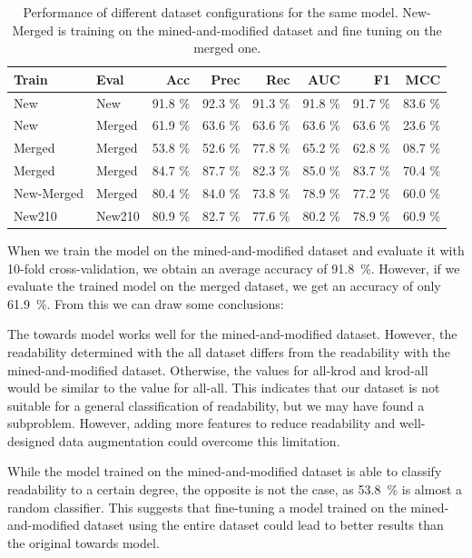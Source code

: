 \documentclass[%
class=scrreprt,
chapterprefix=false,%
open=right,%
twoside=false,%
paper=a4,%
logofile={Logo\_zentral\_farbig\_EN.png},%
thesistype=master,%
UKenglish,%
]{se2thesis}
\theoremstyle{definition}
\begin{document}
	\begin{table}[tb]
		\centering
		\caption{Performance of different dataset configurations for the same model. New-Merged is training on the mined-and-modified dataset and fine tuning on the merged one.}
		\vspace{8pt}
		\label{tab:dataset_performance}
		\begin{tabular}{llrrrrrr}
			\toprule
			Train & Eval & Acc & Prec & Rec & AUC & F1 & MCC \\
			\midrule
			New        	& New    	& 91.8 \% & 92.3 \% & 91.3 \% & 91.8 \% & 91.7 \% & 83.6 \% \\
			New			& Merged     	& 61.9 \% & 63.6 \% & 63.6 \% & 63.6 \% & 63.6 \% & 23.6 \% \\
			Merged        	& Merged     	& 53.8 \% & 52.6 \% & 77.8 \% & 65.2 \% & 62.8 \% & 08.7 \% \\
			Merged        	& Merged   	& 84.7 \% & 87.7 \% & 82.3 \% & 85.0 \% & 83.7 \% & 70.4 \% \\
			New-Merged 	& Merged     	& 80.4 \% & 84.0 \% & 73.8 \% & 78.9 \% & 77.2 \% & 60.0 \% \\
			New210     	& New210  	& 80.9 \% & 82.7 \% & 77.6 \% & 80.2 \% & 78.9 \% & 60.9 \% \\
			\bottomrule
		\end{tabular}
	\end{table}
			
	When we train the model on the mined-and-modified dataset and evaluate it with 10-fold cross-validation, we obtain an average accuracy of 91.8~\%. However, if we evaluate the trained model on the merged dataset, we get an accuracy of only 61.9~\%. From this we can draw some conclusions:
	
	The towards model works well for the mined-and-modified dataset. However, the readability determined with the all dataset differs from the readability with the mined-and-modified dataset. Otherwise, the values for all-krod and krod-all would be similar to the value for all-all. This indicates that our dataset is not suitable for a general classification of readability, but we may have found a subproblem. However, adding more features to reduce readability and well-designed data augmentation could overcome this limitation.
		
	While the model trained on the mined-and-modified dataset is able to classify readability to a certain degree, the opposite is not the case, as 53.8~\%  is almost a random classifier. This suggests that fine-tuning a model trained on the mined-and-modified dataset using the entire dataset could lead to better results than the original towards model.
	
\end{document}
